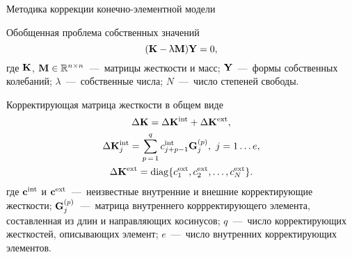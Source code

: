 \begin{frame}{Методика коррекции конечно-элементной модели}
	\begin{block}{Обобщенная проблема собственных значений}
		\begin{equation}
			(\mathbf{K} - \uplambda \mathbf{M}) \mathbf{Y} = 0,
		\end{equation}
		где $ \mathbf{K} $, $ \mathbf{M} \in \mathbb{R} ^ {n \times n}$~---~матрицы жесткости и масс; $ \mathbf{Y} $~---~формы собственных колебаний; $ \lambda $~---~собственные числа; $ N $~---~число степеней свободы.
	\end{block}
	\begin{block}{Корректирующая матрица жесткости в общем виде}
 		\begin{equation}
 			\begin{gathered}
 				\Delta \mathbf{K} = \Delta \mathbf{K} ^ {\text{int}} + \Delta \mathbf{K} ^ {\text{ext}}, \\
				\Delta \mathbf{K} ^ {\text{int}}_j = \sum\limits_{p\,=\,1}^{q} c ^ {\text{int}}_{j+p-1} \mathbf{G}_j^{(p)}, \ j = 1 \hdots e, \\
				\Delta \mathbf{K} ^ {\text{ext}} = \operatorname{diag} \{ c ^ {\text{ext}}_1, c ^ {\text{ext}}_2, \hdots, c ^ {\text{ext}}_N \}.
			\end{gathered}
		\end{equation}
		где $ \mathbf{c} ^ {\text{int}} $ и $ \mathbf{c} ^ {\text{ext}} $~---~неизвестные внутренние и внешние корректирующие жесткости; $ \mathbf{G}_j^{(p)} $~---~матрица внутреннего коррректирующего элемента, составленная из длин и направляющих косинусов; $ q $~---~число корректирующих жесткостей, описывающих элемент; $ e $~---~число внутренних корректирующих элементов.
	\end{block}
\end{frame}

